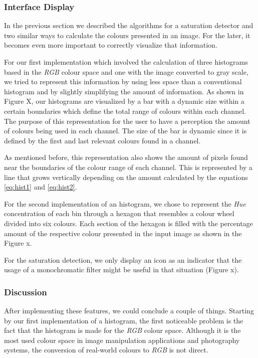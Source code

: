 \subsubsection{Interface Display}
In the previous section we described the algorithms for a saturation detector and two similar ways to calculate the colours presented in an image. For the later, it becomes even more important to correctly visualize that information.

For our first implementation which involved the calculation of three histograms based in the \emph{RGB} colour space and one with the image converted to gray scale, we tried to represent this information by using less space than a conventional histogram and by slightly simplifying the amount of information. As shown in Figure X, our histograms are visualized by a bar with a dynamic size within a certain boundaries which define the total range of colours within each channel. The purpose of this representation for the user to have a perception the amount of colours being used in each channel. The size of the bar is dynamic since it is defined by the first and last relevant colours found in a channel.

As mentioned before, this representation also shows the amount of pixels found near the boundaries of the colour range of each channel. This is represented by a line that grows vertically depending on the amount calculated by the equations \ref{eq:hist1} and \ref{eq:hist2}.


For the second implementation of an histogram, we chose to represent the \emph{Hue} concentration of each bin through a hexagon that resembles a colour wheel divided into six colours. Each section of the hexagon is filled with the percentage amount of the respective colour presented in the input image as shown in the Figure x.

For the saturation detection, we only display an icon as an indicator that the usage of a monochromatic filter might be useful in that situation (Figure x).


\subsubsection{Discussion}

After implementing these features, we could conclude a couple of things. Starting by our first implementation of a histogram, the first noticeable problem is the fact that the histogram is made for the \emph{RGB} colour space. Although it is the most used colour space in image manipulation applications and photography systems, the conversion of real-world colours to \emph{RGB} is not direct.

